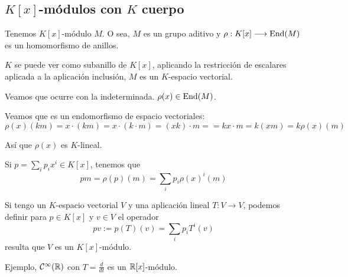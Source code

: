 \subsection{\(K[x]\)-módulos con \(K\) cuerpo}

Tenemos \(K[x]\)-módulo \(M\). O sea, \(M\) es un grupo aditivo
y \(\rho: K[x]\longrightarrow\operatorname{End}(M)\) es un homomorfismo de anillos.

\(K\) se puede ver como subanillo de \(K[x]\), aplicando la
restricción de escalares aplicada a la aplicación inclusión,
\(M\) es un \(K\)-espacio vectorial.

Veamos que ocurre con la indeterminada. \(\rho(x)\in\operatorname{End}(M)\).

Veamos que es un endomorfismo de espacio vectoriales:
\[
  \rho(x)(km)=x\cdot (km)=x\cdot(k\cdot m)=(xk)\cdot m=
  =kx\cdot m=k(xm)=k\rho(x)(m)
\]

Así que \(\rho(x)\) es \(K\)-lineal.

Si \(p=\sum_i p_i x^i\in K[x]\), tenemos que
\[
  pm=\rho(p)(m)=\sum_i p_i {\rho(x)}^i(m)
\]

\begin{prop}
  Si tengo un \(K\)-espacio vectorial \(V\) y una aplicación
  lineal \(T:V\longrightarrow V\), podemos definir para \(p\in K[x]\)
  y \(v\in V\) el operador
  \[
    pv:=p(T)(v)=\sum_i p_i T^i(v)
  \]
  resulta que \(V\) es un \(K[x]\)-módulo.
\end{prop}

Ejemplo, \(\mathcal{C}^\infty(\mathbb{R})\) con \(T=\frac{d}{dt}\)
es un \(\mathbb{R}[x]\)-módulo.
